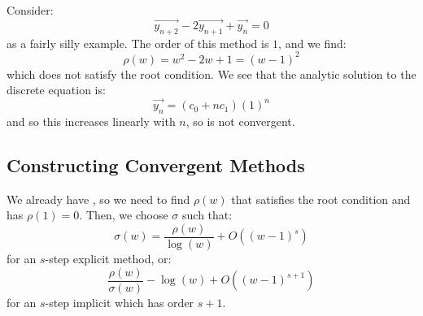 \documentclass[../Main.tex]{subfiles}
\begin{document}
\begin{example}
    Consider:
    \begin{equation*}
        \vec{y_{n+2}} - 2\vec{y_{n+1}} + \vec{y_n} = 0
    \end{equation*}
    as a fairly silly example. The order of this method is $1$, and we find:
    \begin{equation*}
        \rho(w) = w^2 - 2w + 1 = (w - 1)^2
    \end{equation*}
    which does not satisfy the root condition. We see that the analytic solution to the discrete equation is:
    \begin{equation*}
        \vec{y_n} = (c_0 + n c_1) (1)^n
    \end{equation*}
    and so this increases linearly with $n$, so is not convergent.
\end{example}
\subsection{Constructing Convergent Methods}
We already have , so we need to find $\rho(w)$ that satisfies the root condition and has $\rho(1) = 0$. Then, we choose $\sigma$ such that:
\begin{equation*}
    \sigma(w) = \frac{\rho(w)}{\log(w)} + O((w-1)^{s})
\end{equation*}
for an $s$-step explicit method, or:
\begin{equation*}
    \frac{\rho(w)}{\sigma(w)} - \log(w) + O((w-1)^{s + 1})
\end{equation*}
for an $s$-step implicit which has order $s+1$.
\end{document}
